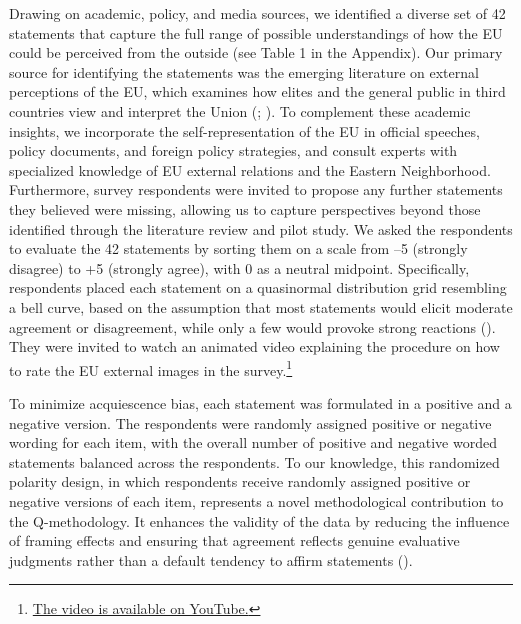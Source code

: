 \documentclass[
  letterpaper,
  DIV=11,
  numbers=noendperiod]{scrartcl}
\begin{document}
Drawing on academic, policy, and media sources, we identified a diverse
set of 42 statements that capture the full range of possible
understandings of how the EU could be perceived from the outside (see
Table 1 in the Appendix). Our primary source for identifying the
statements was the emerging literature on external perceptions of the
EU, which examines how elites and the general public in third countries
view and interpret the Union (; ). To complement these academic insights, we incorporate the
self-representation of the EU in official speeches, policy documents,
and foreign policy strategies, and consult experts with specialized
knowledge of EU external relations and the Eastern Neighborhood.
Furthermore, survey respondents were invited to propose any further
statements they believed were missing, allowing us to capture
perspectives beyond those identified through the literature review and
pilot study. We asked the respondents to evaluate the 42 statements by
sorting them on a scale from --5 (strongly disagree) to +5 (strongly
agree), with 0 as a neutral midpoint. Specifically, respondents placed
each statement on a quasinormal distribution grid resembling a bell
curve, based on the assumption that most statements would elicit
moderate agreement or disagreement, while only a few would provoke
strong reactions ().
They were invited to watch an animated video explaining the procedure on
how to rate the EU external images in the survey.\footnote{\href{https://www.youtube.com/watch?v=P2NmxqHpt8g}{The
  video is available on YouTube.}}

To minimize acquiescence bias, each statement was formulated in a
positive and a negative version. The respondents were randomly assigned
positive or negative wording for each item, with the overall number of
positive and negative worded statements balanced across the respondents.
To our knowledge, this randomized polarity design, in which respondents
receive randomly assigned positive or negative versions of each item,
represents a novel methodological contribution to the Q-methodology. It
enhances the validity of the data by reducing the influence of framing
effects and ensuring that agreement reflects genuine evaluative
judgments rather than a default tendency to affirm statements
().
\end{document}
